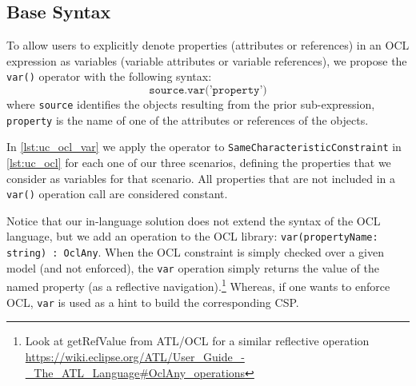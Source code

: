 \subsection{Base Syntax}
To allow users to explicitly denote properties (attributes or references) in an OCL expression as variables (variable attributes or variable references), 
we propose the \texttt{var()} operator with the following syntax:
$$\texttt{source.var('property')}$$ 
where \texttt{source} identifies the objects resulting from the
prior sub-expression,
\texttt{property} is the name of one of the attributes or references of the objects. 

In \autoref{lst:uc_ocl_var} we apply the operator to \texttt{SameCharacteristicConstraint} in \autoref{lst:uc_ocl} for each one of our three scenarios, defining the properties that we consider as variables for that scenario. All properties that are not included in a \texttt{var()} operation call are considered constant.

Notice that our in-language solution does not extend the syntax of the OCL language, but we add an operation to the OCL library: \texttt{var(propertyName: string) : OclAny}. 
When the OCL constraint is simply checked over a given model (and not enforced), the \texttt{var} operation simply returns the value of the named property (as a reflective navigation).\footnote{Look at getRefValue from ATL/OCL for a similar reflective operation \url{https://wiki.eclipse.org/ATL/User\_Guide\_-\_The\_ATL\_Language\#OclAny_operations}}
Whereas, if one wants to enforce OCL, \texttt{var} is used as a hint to build the corresponding CSP.

